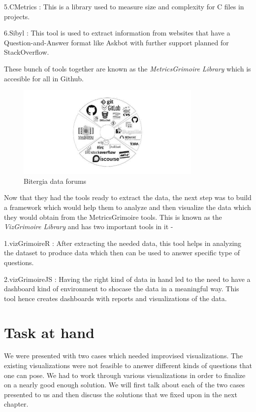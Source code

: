 \documentclass[double,12pt]{beavtex}
\begin{document}
5.CMetrics : This is a library used to measure size and complexity for C files in projects.

6.Sibyl : This tool is used to extract information from websites that have a Question-and-Answer format like Askbot with further support planned for StackOverflow.

These bunch of tools together are known as the \emph{MetricsGrimoire Library} which is accesible for all in Github.

\begin{figure}[!ht]
\centering
\includegraphics[width=90mm]{bitergia.jpg}
\caption{Bitergia data forums}
\end{figure}

Now that they had the tools ready to extract the data, the next step was to build a framework which would help them to analyze and then visualize the data which they would obtain from the MetricsGrimoire tools. This is known as the \emph{VizGrimoire Library} and has two important tools in it -

1.vizGrimoireR : After extracting the needed data, this tool helps in analyzing the dataset to produce data which then can be used to answer specific type of questions.

2.vizGrimoireJS : Having the right kind of data in hand led to the need to have a dashboard kind of environment to shocase the data in a meaningful way. This tool hence creates dashboards with reports and visualizations of the data.

\section{Task at hand}
We were presented with two cases which needed improvised visualizations. The existing visualizations were not feasible to answer different kinds of questions that one can pose. We had to work through various visualizations in order to finalize on a nearly good enough solution. We will first talk about each of the two cases presented to us and then discuss the solutions that we fixed upon in the next chapter.
\end{document}

